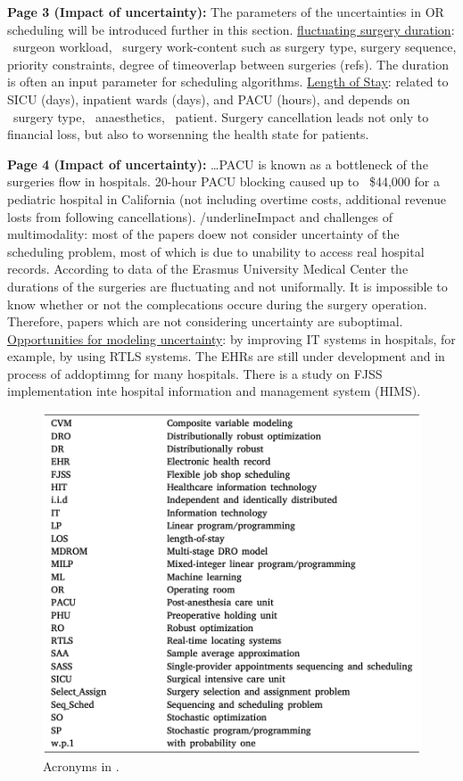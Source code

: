     \textbf{Page 3 (Impact of uncertainty):}
    The parameters of the uncertainties in OR scheduling will be introduced further in this section. \underline{fluctuating surgery duration}: ~surgeon workload, ~surgery work-content such as surgery type, surgery sequence, priority constraints, degree of timeoverlap between surgeries (refs). The duration is often an input parameter for scheduling algorithms. \underline{Length of Stay}: related to SICU (days), inpatient wards (days), and PACU (hours), and depends on ~surgery type, ~anaesthetics, ~patient. Surgery cancellation leads not only to financial loss, but also to worsenning the health state for patients.

    \textbf{Page 4 (Impact of uncertainty):}
    \dots PACU is known as a bottleneck of the surgeries flow in hospitals. 20-hour PACU blocking caused up to ~\$44,000 for a pediatric hospital in California (not including overtime costs, additional revenue losts from following cancellations). /underline{Impact and challenges of multimodality}: most of the papers doew not consider uncertainty of the scheduling problem, most of which is due to unability to access real hospital records. According to data of the Erasmus University Medical Center the durations of the surgeries are fluctuating and not uniformally. It is impossible to know whether or not the complecations occure during the surgery operation. Therefore, papers which are not considering uncertainty are suboptimal. \underline{Opportunities for modeling uncertainty}: by improving IT systems in hospitals, for example, by using RTLS systems. The EHRs are still under development and in process of addoptimng for many hospitals. There is a study on FJSS implementation inte hospital information and management system (HIMS).
    \begin{figure}[H]
        \centering
        \includegraphics[width=.9\textwidth]{figures/SR0015US22/fig2.png}
        \caption{Acronyms in \cite{x335}.}
        \label{fig2:SR0015US22}
    \end{figure}
